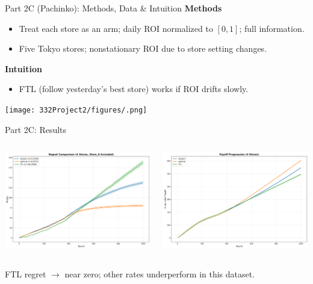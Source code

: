 \documentclass{beamer}
\begin{document}
\begin{frame}{Part 2C (Pachinko): Methods, Data \& Intuition}
\textbf{Methods}
\begin{itemize}
  \item Treat each store as an arm; daily ROI normalized to $[0,1]$; full information.
  \item Five Tokyo stores; nonstationary ROI due to store setting changes.
\end{itemize}
\textbf{Intuition}
\begin{itemize}
  \item FTL (follow yesterday’s best store) works if ROI drifts slowly.
\end{itemize}
\centering
\texttt{[image: 332Project2/figures/.png]}
\end{frame}

\begin{frame}{Part 2C: Results}
\begin{columns}[T,onlytextwidth]
  \centering
  \includegraphics[width=\linewidth]{332Project2/figures/PP_regret.png}

  \centering
  \includegraphics[width=\linewidth]{332Project2/figures/PP_payoff.png}
\end{columns}
\small FTL regret $\to$ near zero; other rates underperform in this dataset.
\end{frame}
\end{document}

